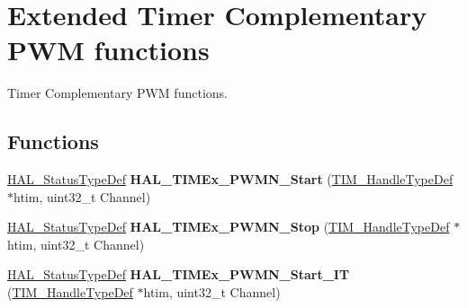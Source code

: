 \hypertarget{group___t_i_m_ex___exported___functions___group3}{}\section{Extended Timer Complementary P\+WM functions}
\label{group___t_i_m_ex___exported___functions___group3}


Timer Complementary P\+WM functions.  


\subsection*{Functions}
\begin{DoxyCompactItemize}
\item 
\mbox{\label{group___t_i_m_ex___exported___functions___group3_ga4f2b0bb4b66a5acd76eac4e8d32cc498}} 
\hyperlink{stm32f4xx__hal__def_8h_a63c0679d1cb8b8c684fbb0632743478f}{H\+A\+L\+\_\+\+Status\+Type\+Def} {\bfseries H\+A\+L\+\_\+\+T\+I\+M\+Ex\+\_\+\+P\+W\+M\+N\+\_\+\+Start} (\hyperlink{struct_t_i_m___handle_type_def}{T\+I\+M\+\_\+\+Handle\+Type\+Def} $\ast$htim, uint32\+\_\+t Channel)
\item 
\mbox{\label{group___t_i_m_ex___exported___functions___group3_ga0f2e27f3fb6d8f42d998e2071e5f0482}} 
\hyperlink{stm32f4xx__hal__def_8h_a63c0679d1cb8b8c684fbb0632743478f}{H\+A\+L\+\_\+\+Status\+Type\+Def} {\bfseries H\+A\+L\+\_\+\+T\+I\+M\+Ex\+\_\+\+P\+W\+M\+N\+\_\+\+Stop} (\hyperlink{struct_t_i_m___handle_type_def}{T\+I\+M\+\_\+\+Handle\+Type\+Def} $\ast$htim, uint32\+\_\+t Channel)
\item 
\mbox{\label{group___t_i_m_ex___exported___functions___group3_ga82f0b53f6b10e6aafc6835178662c488}} 
\hyperlink{stm32f4xx__hal__def_8h_a63c0679d1cb8b8c684fbb0632743478f}{H\+A\+L\+\_\+\+Status\+Type\+Def} {\bfseries H\+A\+L\+\_\+\+T\+I\+M\+Ex\+\_\+\+P\+W\+M\+N\+\_\+\+Start\+\_\+\+IT} (\hyperlink{struct_t_i_m___handle_type_def}{T\+I\+M\+\_\+\+Handle\+Type\+Def} $\ast$htim, uint32\+\_\+t Channel)
\item 
\mbox{\label{group___t_i_m_ex___exported___functions___group3_ga13848e20df29fa552ef4f5b69fef20a6}} 

\end{DoxyCompactItemize}
